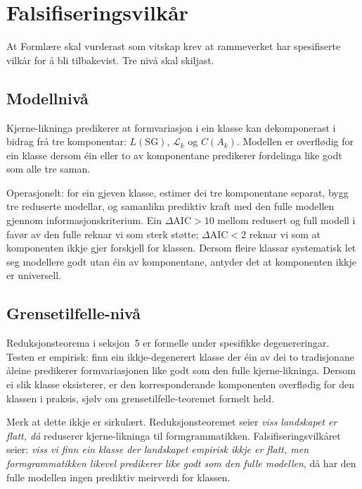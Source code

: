 \documentclass[10pt,a4paper,twocolumn]{article}
\begin{document}
\section{Falsifiseringsvilkår}

At Formlære skal vurderast som vitskap krev at rammeverket har spesifiserte vilkår for å bli tilbakevist. Tre nivå skal skiljast.

\subsection{Modellnivå}

Kjerne-likninga predikerer at formvariasjon i ein klasse kan dekomponerast i bidrag frå tre komponentar: $L(\mathrm{SG})$, $\mathcal{L}_k$ og $C(A_k)$. Modellen er overflødig for ein klasse dersom éin eller to av komponentane predikerer fordelinga like godt som alle tre saman.

Operasjonelt: for ein gjeven klasse, estimer dei tre komponentane separat, bygg tre reduserte modellar, og samanlikn prediktiv kraft med den fulle modellen gjennom informasjonskriterium. Ein $\Delta\mathrm{AIC} > 10$ mellom redusert og full modell i favør av den fulle reknar vi som sterk støtte; $\Delta\mathrm{AIC} < 2$ reknar vi som at komponenten ikkje gjer forskjell for klassen. Dersom fleire klassar systematisk let seg modellere godt utan éin av komponentane, antyder det at komponenten ikkje er universell.

\subsection{Grensetilfelle-nivå}

Reduksjonsteorema i seksjon~5 er formelle under spesifikke degenereringar. Testen er empirisk: finn ein ikkje-degenerert klasse der éin av dei to tradisjonane åleine predikerer formvariasjonen like godt som den fulle kjerne-likninga. Dersom ei slik klasse eksisterer, er den korresponderande komponenten overflødig for den klassen i praksis, sjølv om grensetilfelle-teoremet formelt held.

Merk at dette ikkje er sirkulært. Reduksjonsteoremet seier \textit{viss landskapet er flatt, då} reduserer kjerne-likninga til formgrammatikken. Falsifiseringsvilkåret seier: \textit{viss vi finn ein klasse der landskapet empirisk ikkje er flatt, men formgrammatikken likevel predikerer like godt som den fulle modellen}, då har den fulle modellen ingen prediktiv meirverdi for klassen.
\end{document}
